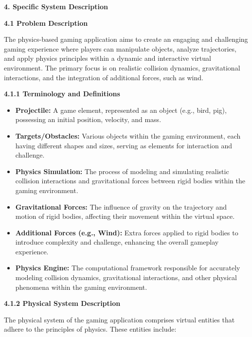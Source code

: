 \documentclass[
]{article}
\begin{document}
\protect\hypertarget{qr}{}{}\textbf{4. Specific System Description}

\protect\hypertarget{qrr}{}{}\textbf{4.1 Problem Description}

The physics-based gaming application aims to create an engaging and
challenging gaming experience where players can manipulate objects,
analyze trajectories, and apply physics principles within a dynamic and
interactive virtual environment. The primary focus is on realistic
collision dynamics, gravitational interactions, and the integration of
additional forces, such as wind.

\protect\hypertarget{qrrr}{}{}\textbf{4.1.1 Terminology and Definitions}

\begin{itemize}
\item
  \textbf{Projectile:} A game element, represented as an object (e.g.,
  bird, pig), possessing an initial position, velocity, and mass.
\item
  \textbf{Targets/Obstacles:} Various objects within the gaming
  environment, each having different shapes and sizes, serving as
  elements for interaction and challenge.
\item
  \textbf{Physics Simulation:} The process of modeling and simulating
  realistic collision interactions and gravitational forces between
  rigid bodies within the gaming environment.
\item
  \textbf{Gravitational Forces:} The influence of gravity on the
  trajectory and motion of rigid bodies, affecting their movement within
  the virtual space.
\item
  \textbf{Additional Forces (e.g., Wind):} Extra forces applied to rigid
  bodies to introduce complexity and challenge, enhancing the overall
  gameplay experience.
\item
  \textbf{Physics Engine:} The computational framework responsible for
  accurately modeling collision dynamics, gravitational interactions,
  and other physical phenomena within the gaming environment.
\end{itemize}

\protect\hypertarget{qrrrr}{}{}\textbf{4.1.2 Physical System
Description}

The physical system of the gaming application comprises virtual entities
that adhere to the principles of physics. These entities include:
\end{document}
